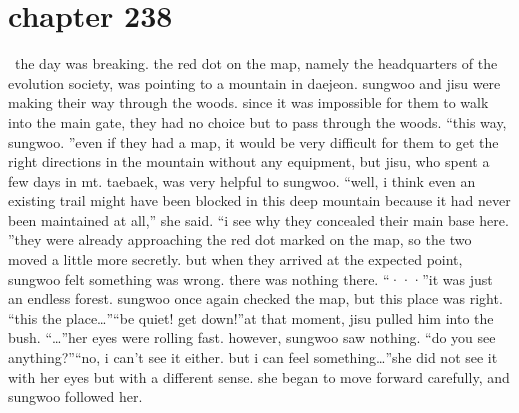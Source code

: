 \section{chapter 238}






 the day was breaking.
 the red dot on the map, namely the headquarters of the evolution society, was pointing to a mountain in daejeon.
sungwoo and jisu were making their way through the woods.
 since it was impossible for them to walk into the main gate, they had no choice but to pass through the woods.
“this way, sungwoo.
”even if they had a map, it would be very difficult for them to get the right directions in the mountain without any equipment, but jisu, who spent a few days in mt.
 taebaek, was very helpful to sungwoo.
“well, i think even an existing trail might have been blocked in this deep mountain because it had never been maintained at all,” she said.
“i see why they concealed their main base here.
”they were already approaching the red dot marked on the map, so the two moved a little more secretly.
but when they arrived at the expected point, sungwoo felt something was wrong.
there was nothing there.
“···”it was just an endless forest.
 sungwoo once again checked the map, but this place was right.
 “this the place…”“be quiet! get down!”at that moment, jisu pulled him into the bush.
“…”her eyes were rolling fast.
 however, sungwoo saw nothing.
“do you see anything?”“no, i can’t see it either.
 but i can feel something…”she did not see it with her eyes but with a different sense.
 she began to move forward carefully, and sungwoo followed her.

